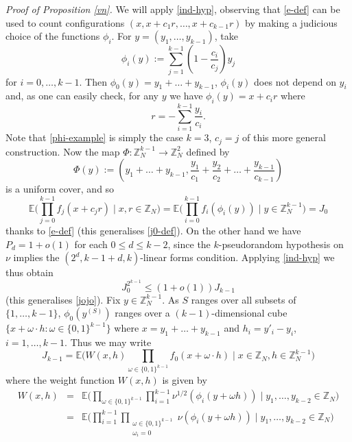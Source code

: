 \documentclass[12pt,a4paper,reqno]{amsart}
\numberwithin{equation}{section}
\theoremstyle{plain}
\theoremstyle{definition}
\renewcommand{\leq}{\leqslant}
\def\E{{\mathbb E}}
\def\ni{\noindent}
\begin{document}
\ni\noindent\textit{Proof of Proposition \ref{vn}.}
We will apply \eqref{ind-hyp}, observing that \eqref{e-def} can be used to count configurations $(x,x+c_1r,\dots,x + c_{k-1}r)$ by making a judicious choice of the functions $\phi_i$.  For $y = (y_1,\ldots,y_{k-1})$, take 
\[ \phi_i(y) := \sum_{j = 1}^{k-1} \left(1 - \frac{c_i}{c_j}\right)y_j\] for $i = 0,\dots,k-1$. Then $\phi_0(y) = y_1 + \dots + y_{k-1}$, $\phi_i(y)$ does not depend on $y_i$ and, as one can easily check, for any $y$ we have $\phi_i(y) = x + c_i r$ where
\[ r = -\sum_{i=1}^{k-1} \frac{y_i}{c_i}.\]
Note that \eqref{phi-example} is simply the case $k=3$, $c_j = j$ of this more general construction.
Now the map $\Phi : \mathbb{Z}_N^{k-1} \rightarrow \mathbb{Z}_N^2$ defined by
\[ \Phi(y) := (y_1+\dots+y_{k-1},\frac{y_1}{c_1} + \frac{y_2}{c_2} + \dots + \frac{y_{k-1}}{c_{k-1}})\] is a uniform cover, and so 
\begin{equation}\label{eqn5.11}
\mathbb{E}\bigg(\prod_{j=0}^{k-1} f_j(x + c_jr) \; \bigg| \; x,r \in \mathbb{Z}_N\bigg) = \mathbb{E}\bigg(\prod_{i=0}^{k-1} f_i(\phi_i(y)) \; \bigg| \; y \in \mathbb{Z}_N^{k-1}\bigg) = J_0
\end{equation} 
thanks to \eqref{e-def} (this generalises \eqref{j0-def}).  On the other hand
we have $P_d = 1 + o(1)$ for each $0 \leq d \leq k - 2$, since
the $k$-pseudorandom hypothesis on $\nu$ implies the
$(2^d, k-1+d,k)$-linear forms condition. Applying \eqref{ind-hyp} 
we thus obtain
\begin{equation}\label{eqn5.12} J_0^{2^{k-1}} \leq  (1 + o(1))J_{k-1}\end{equation}
(this generalises \eqref{jojo}).
Fix $y \in \mathbb{Z}_N^{k-1}$. As $S$ ranges over all subsets of $\{1,\dots,k-1\}$, $\phi_0(y^{(S)})$ ranges over a $(k-1)$-dimensional cube $\{ x + \omega \cdot h : \omega \in \{0,1\}^{k-1}\}$ where $x = y_1 + \dots + y_{k-1}$ and $h_i = y'_i - y_i$, $i = 1,\dots,k-1$. Thus we may write
\begin{equation}\label{eq21} J_{k-1} = \E\bigg( W(x,h) 
\prod_{\omega \in \{0,1\}^{k-1}} 
f_0(x + \omega \cdot h)\; \bigg| \; 
x \in \mathbb{Z}_N, h \in \mathbb{Z}_N^{k-1} \bigg)\end{equation}
where the weight function $W(x,h)$ is given by
\begin{eqnarray*} W(x,h) & = & 
\E \bigg(\prod_{\omega \in \{0,1\}^{k-1}} \prod_{i=1}^{k-1} \nu^{1/2}(\phi_i (y + \omega h)) \;  \bigg| \; y_1,\dots,y_{k-2}\in \mathbb{Z}_N\bigg) \\ 
& = & \E \bigg( \prod_{i=1}^{k-1}\prod_{\substack{ \omega \in \{0,1\}^{k-1} \\ \omega_i = 0}} \nu(\phi_i(y+\omega h))\; 
\bigg| \; y_1,\dots,y_{k-2} \in \mathbb{Z}_N\bigg)\end{eqnarray*}
\end{document}
